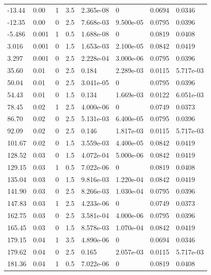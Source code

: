 \documentclass[preview]{standalone}
\begin{document}
{{\begin{tabular}{L{1.2cm}C{1.2cm} C{0.3cm}C{0.5cm} C{1.4cm}C{1.4cm} C{1.4cm}C{1.4cm}}
  -13.44  &  0.00  & 1     & 3.5 &  2.365e-08  & 0  & 0.0694 &  0.0346   \\ 
  -12.35  &  0.00  & 0     & 2.5 &  7.668e-03  & 9.500e-05  & 0.0795 &  0.0396   \\ 
  -5.486  &  0.001  & 1     & 0.5 &  1.688e-08  & 0  & 0.0819 &  0.0408   \\ 
  3.016  &  0.001  & 0     & 1.5 &  1.653e-03  & 2.100e-05  & 0.0842 &  0.0419   \\ 
  3.297  &  0.001  & 0     & 2.5 &  2.228e-04  & 3.000e-06  & 0.0795 &  0.0396   \\ 
  35.60  &  0.01  & 0     & 2.5 &  0.184  & 2.289e-03  & 0.0115 &  5.717e-03   \\ 
  50.04  &  0.01  & 0     & 2.5 &  3.041e-05  & 0  & 0.0795 &  0.0396   \\ 
  54.43  &  0.01  & 0     & 1.5 &  0.134  & 1.669e-03  & 0.0122 &  6.051e-03   \\ 
  78.45  &  0.02  & 1     & 2.5 &  4.000e-06  & 0  & 0.0749 &  0.0373   \\ 
  86.70  &  0.02  & 0     & 2.5 &  5.131e-03  & 6.400e-05  & 0.0795 &  0.0396   \\ 
  92.09  &  0.02  & 0     & 2.5 &  0.146  & 1.817e-03  & 0.0115 &  5.717e-03   \\ 
  101.67  &  0.02  & 0     & 1.5 &  3.559e-03  & 4.400e-05  & 0.0842 &  0.0419   \\ 
  128.52  &  0.03  & 0     & 1.5 &  4.072e-04  & 5.000e-06  & 0.0842 &  0.0419   \\ 
  129.15  &  0.03  & 1     & 0.5 &  7.022e-06  & 0  & 0.0819 &  0.0408   \\ 
  135.04  &  0.03  & 0     & 1.5 &  9.816e-03  & 1.220e-04  & 0.0842 &  0.0419   \\ 
  141.90  &  0.03  & 0     & 2.5 &  8.266e-03  & 1.030e-04  & 0.0795 &  0.0396   \\ 
  147.83  &  0.03  & 1     & 2.5 &  4.233e-06  & 0  & 0.0749 &  0.0373   \\ 
  162.75  &  0.03  & 0     & 2.5 &  3.581e-04  & 4.000e-06  & 0.0795 &  0.0396   \\ 
  165.45  &  0.03  & 0     & 1.5 &  8.578e-03  & 1.070e-04  & 0.0842 &  0.0419   \\ 
  179.15  &  0.04  & 1     & 3.5 &  4.890e-06  & 0  & 0.0694 &  0.0346   \\ 
  179.62  &  0.04  & 0     & 2.5 &  0.165  & 2.057e-03  & 0.0115 &  5.717e-03   \\ 
  181.36  &  0.04  & 1     & 0.5 &  7.022e-06  & 0  & 0.0819 &  0.0408   \\ 

\end{tabular}}}
\end{document}
